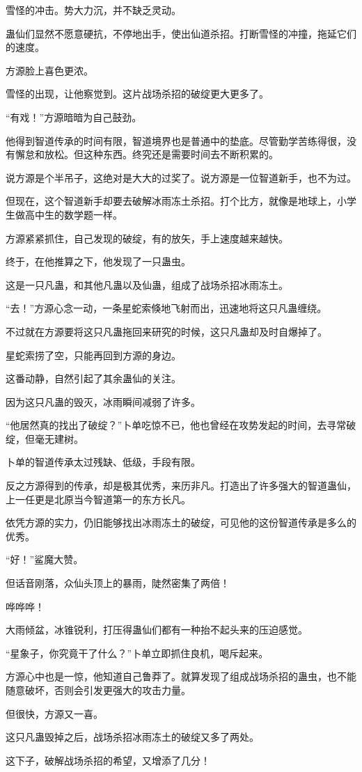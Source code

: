 \begin{this_body}
雪怪的冲击。势大力沉，并不缺乏灵动。

蛊仙们显然不愿意硬抗，不停地出手，使出仙道杀招。打断雪怪的冲撞，拖延它们的速度。

方源脸上喜色更浓。

雪怪的出现，让他察觉到。这片战场杀招的破绽更大更多了。

“有戏！”方源暗暗为自己鼓劲。

他得到智道传承的时间有限，智道境界也是普通中的垫底。尽管勤学苦练得很，没有懈怠和放松。但这种东西。终究还是需要时间去不断积累的。

说方源是个半吊子，这绝对是大大的过奖了。说方源是一位智道新手，也不为过。

但现在，这个智道新手却要去破解冰雨冻土杀招。打个比方，就像是地球上，小学生做高中生的数学题一样。

方源紧紧抓住，自己发现的破绽，有的放矢，手上速度越来越快。

终于，在他推算之下，他发现了一只蛊虫。

这是一只凡蛊，和其他凡蛊以及仙蛊，组成了战场杀招冰雨冻土。

“去！”方源心念一动，一条星蛇索倏地飞射而出，迅速地将这只凡蛊缠绕。

不过就在方源要将这只凡蛊拖回来研究的时候，这只凡蛊却及时自爆掉了。

星蛇索捞了空，只能再回到方源的身边。

这番动静，自然引起了其余蛊仙的关注。

因为这只凡蛊的毁灭，冰雨瞬间减弱了许多。

“他居然真的找出了破绽？”卜单吃惊不已，他也曾经在攻势发起的时间，去寻常破绽，但毫无建树。

卜单的智道传承太过残缺、低级，手段有限。

反之方源得到的传承，却是极其优秀，来历非凡。打造出了许多强大的智道蛊仙，上一任更是北原当今智道第一的东方长凡。

依凭方源的实力，仍旧能够找出冰雨冻土的破绽，可见他的这份智道传承是多么的优秀。

“好！”鲨魔大赞。

但话音刚落，众仙头顶上的暴雨，陡然密集了两倍！

哗哗哗！

大雨倾盆，冰锥锐利，打压得蛊仙们都有一种抬不起头来的压迫感觉。

“星象子，你究竟干了什么？”卜单立即抓住良机，喝斥起来。

方源心中也是一惊，他知道自己鲁莽了。就算发现了组成战场杀招的蛊虫，也不能随意破坏，否则会引发更强大的攻击力量。

但很快，方源又一喜。

这只凡蛊毁掉之后，战场杀招冰雨冻土的破绽又多了两处。

这下子，破解战场杀招的希望，又增添了几分！

\end{this_body}

